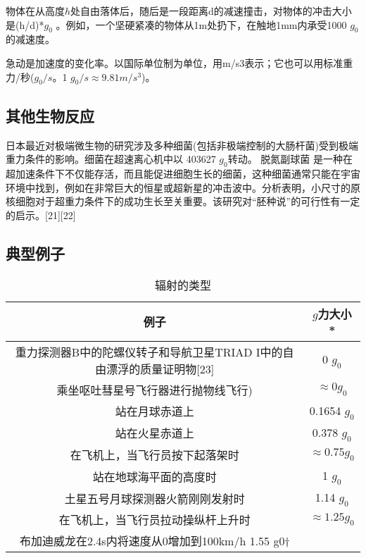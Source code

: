 物体在从高度$h$处自由落体后，随后是一段距离d的减速撞击，对物体的冲击大小是(h/d)*$g_0$ 。例如，一个坚硬紧凑的物体从1m处扔下，在触地1mm内承受1000 $g_0$ 的减速度。

急动是加速度的变化率。以国际单位制为单位，用m/s3表示；它也可以用标准重力/秒($g_0/s$。1 $g_0/s \approx 9.81 m/s^3$)。

\subsection{其他生物反应}
日本最近对极端微生物的研究涉及多种细菌(包括非极端控制的大肠杆菌)受到极端重力条件的影响。细菌在超速离心机中以 403627 $g_0$转动。 脱氮副球菌 是一种在超加速条件下不仅能存活，而且能促进细胞生长的细菌，这种细菌通常只能在宇宙环境中找到，例如在非常巨大的恒星或超新星的冲击波中。分析表明，小尺寸的原核细胞对于超重力条件下的成功生长至关重要。该研究对“胚种说”的可行性有一定的启示。[21][22]

\subsection{典型例子}
\begin{table}[ht]
\centering
\caption{辐射的类型}\label{DLFS_1}
\begin{tabular}{|c|c}
\hline
\textbf{例子} & \textbf{$g$力大小*}\\
\hline
重力探测器B中的陀螺仪转子和导航卫星TRIAD I中的自由漂浮的质量证明物[23] & 0 $g_0$\\
\hline
乘坐呕吐彗星号飞行器进行抛物线飞行) & $\approx 0 g_0$ \\
\hline
站在月球赤道上 & 0.1654 $g_0$ \\
\hline
站在火星赤道上 & 0.378 $g_0$ \\
\hline
在飞机上，当飞行员按下起落架时 & $\approx 0.75 g_0$ \\
\hline
站在地球海平面的高度时 & 1 $g_0$ \\
\hline
土星五号月球探测器火箭刚刚发射时 & 1.14 $g_0$ \\
\hline
在飞机上，当飞行员拉动操纵杆上升时 & $\approx 1.25 g_0$ \\
\hline
布加迪威龙在2.4s内将速度从0增加到100km/h	1.55 g0†
\hline


\hline
\end{tabular}
\end{table}